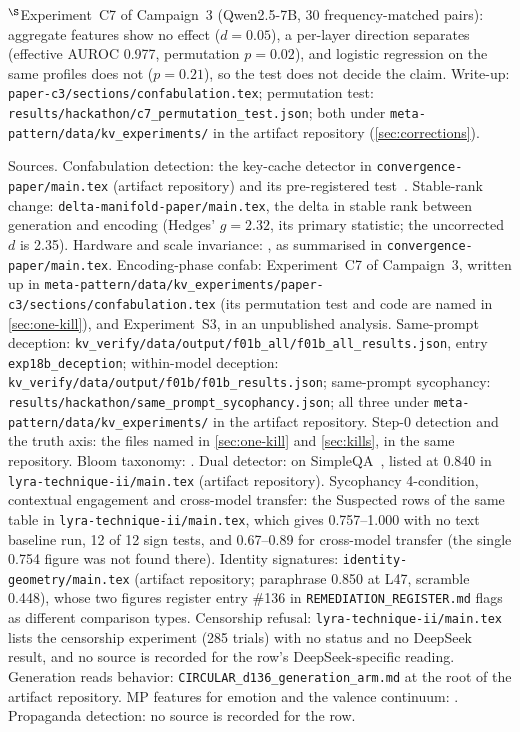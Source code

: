 \documentclass[11pt,a4paper]{article}
\begin{document}
{$^{\S}$Experiment~C7 of Campaign~3 (Qwen2.5-7B, 30 frequency-matched
pairs): aggregate features show no effect ($d{=}0.05$), a per-layer
direction separates (effective AUROC 0.977, permutation $p{=}0.02$),
and logistic regression on the same profiles does not ($p{=}0.21$), so
the test does not decide the claim. Write-up:
\nolinkurl{paper-c3/sections/confabulation.tex}; permutation test:
\nolinkurl{results/hackathon/c7_permutation_test.json}; both under
\nolinkurl{meta-pattern/data/kv_experiments/} in the artifact
repository (\cref{sec:corrections}).

Sources. Confabulation detection: the key-cache detector in
\nolinkurl{convergence-paper/main.tex} (artifact repository) and its
pre-registered test~\citep{lyra2026oracle}. Stable-rank change:
\nolinkurl{delta-manifold-paper/main.tex}, the delta in stable rank
between generation and encoding (Hedges' $g{=}2.32$, its primary
statistic; the uncorrected $d$ is 2.35). Hardware and scale
invariance: \citet{lyra2026campaign2}, as summarised in
\nolinkurl{convergence-paper/main.tex}. Encoding-phase confab:
Experiment~C7 of Campaign~3, written up in
\nolinkurl{meta-pattern/data/kv_experiments/paper-c3/sections/confabulation.tex}
(its permutation test and code are named in \cref{sec:one-kill}), and
Experiment~S3, in an unpublished analysis. Same-prompt deception:
\nolinkurl{kv_verify/data/output/f01b_all/f01b_all_results.json}, entry
\texttt{exp18b\_deception}; within-model deception:
\nolinkurl{kv_verify/data/output/f01b/f01b_results.json}; same-prompt
sycophancy: \nolinkurl{results/hackathon/same_prompt_sycophancy.json};
all three under \nolinkurl{meta-pattern/data/kv_experiments/} in the
artifact repository. Step-0 detection and the
truth axis: the files named in \cref{sec:one-kill} and
\cref{sec:kills}, in the same repository. Bloom taxonomy: \citet{lyra2026campaign2}. Dual
detector: on SimpleQA~\citep{wei2024simpleqa}, listed at 0.840 in
\nolinkurl{lyra-technique-ii/main.tex} (artifact repository).
Sycophancy 4-condition, contextual engagement and cross-model
transfer: the Suspected rows of the same table in
\nolinkurl{lyra-technique-ii/main.tex}, which gives 0.757--1.000 with
no text baseline run, 12 of 12 sign tests, and 0.67--0.89 for
cross-model transfer (the single 0.754 figure was not found there).
Identity signatures: \nolinkurl{identity-geometry/main.tex} (artifact
repository; paraphrase 0.850 at L47, scramble 0.448), whose two figures
register entry \#136 in \nolinkurl{REMEDIATION_REGISTER.md} flags as
different comparison types. Censorship refusal:
\nolinkurl{lyra-technique-ii/main.tex} lists the censorship experiment
(285 trials) with no status and no DeepSeek result, and no source is
recorded for the row's DeepSeek-specific reading. Generation reads
behavior: \nolinkurl{CIRCULAR_d136_generation_arm.md} at the root of
the artifact repository. MP features for emotion and the valence
continuum: \citet{lyra2026usermodel}. Propaganda detection: no
source is recorded for the row.\par}
\end{document}
